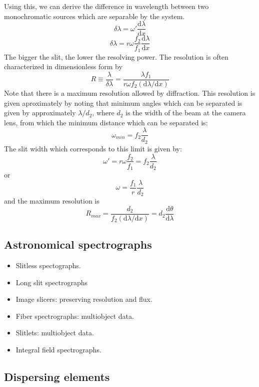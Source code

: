 \documentclass[12pt]{article}
\begin{document}
Using this, we can derive the difference in wavelength between two
monochromatic sources which are separable by the system.
$$ \delta\lambda = \omega'\frac{\textrm{d}\lambda}{\textrm{d}x} $$
$$ \delta\lambda = r\omega\frac{f_{2}}{f_{1}}\frac{\textrm{d}\lambda}{\textrm{d}x} $$
The bigger the slit, the lower the resolving power.
The resolution is often characterized in dimensionless form by{$$
    R \equiv \frac{\lambda}{\delta\lambda} =
    \frac{\lambda{f_{1}}}{r\omega{f_{2}}\left(
        \textrm{d}\lambda/\textrm{d}x\right)}
$$}Note that there is a maximum resolution allowed by diffraction. This
resolution is given aproximately by noting that minimum angles which
can be separated is given by approximately $\lambda/d_{2}$,
where $d_{2}$ is
the width of the beam at the camera lens, from which the minimum
distance which can be separated is:{$$
    \omega_{min} = f_{2}\frac{\lambda}{d_{2}}
$$}The slit width which corresponds to this limit is given by:{$$
    \omega' = r\omega\frac{f_{2}}{f_{1}} = f_{2}\frac{\lambda}{d_{2}}
$$}or{$$
    \omega = \frac{f_{1}}{r}\frac{\lambda}{d_{2}}
$$}and the maximum resolution is{$$
    R_{max} =
    \frac{d_{2}}{f_{2}\left(\textrm{d}\lambda/\textrm{d}x\right)} =
    d_{2}\frac{\textrm{d}\theta}{\textrm{d}\lambda}
$$}
\subsection{Astronomical spectrographs}
\begin{itemize}
    \item Slitless spectographs.
    \item Long slit spectrographs
    \item Image slicers: preserving resolution and flux.
    \item Fiber spectrographs: multiobject data.
    \item Slitlets: multiobject data.
    \item Integral field spectrographs.
\end{itemize}

\subsection{Dispersing elements}
\end{document}
